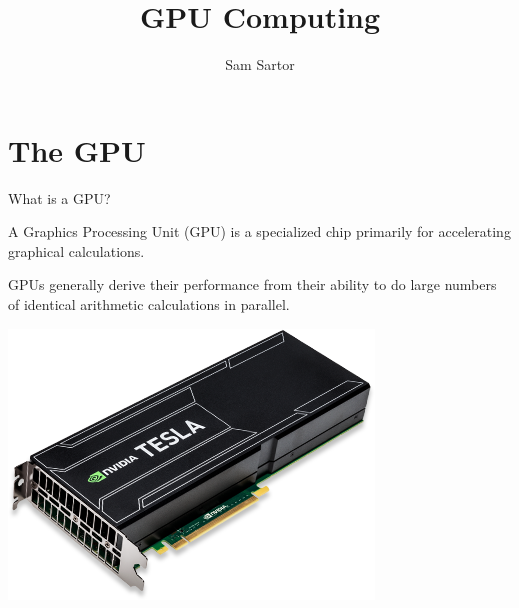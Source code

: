 \documentclass{lug}
\title{GPU Computing}
\author{Sam Sartor}
\institute{Mines Linux Users Group}
\newcommand{\pmidg}[1]{\parbox{\widthof{#1}}{#1}}
\newcommand{\splitslide}[4]{
    \noindent
    \begin{minipage}{#1 \textwidth - #2 }
        #3
    \end{minipage}%
    \hspace{ \dimexpr #2 * 2 \relax }%
    \begin{minipage}{\textwidth - #1 \textwidth - #2 }
        #4
    \end{minipage}
}
\begin{document}
\section{The GPU}

\begin{frame}{What is a GPU?}
    \splitslide{0.65}{.7em}{

        A Graphics Processing Unit (GPU) is a specialized chip primarily for
        accelerating graphical calculations.

        \vspace{2ex}

        GPUs generally derive their performance from their ability to do large
        numbers of identical arithmetic calculations in parallel.

    }{
        \pmidg{\includegraphics[width=\textwidth]{graphics/tesla}}
    }
\end{frame}
\end{document}
